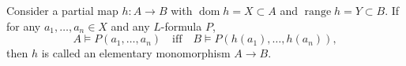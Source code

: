 Consider a partial map $h : A \rightarrow B$ with $\operatorname{dom} h = X \subset A$ and $\operatorname{range} h = Y \subset B$. If for any $a_1, \ldots, a_n \in X$ and any $L$-formula $P$,
$$A \vDash P(a_1, \ldots, a_n) \quad \text{iff} \quad B \vDash P(h(a_1), \ldots, h(a_n)),$$
then $h$ is called an elementary monomorphism $A \rightarrow B$.
